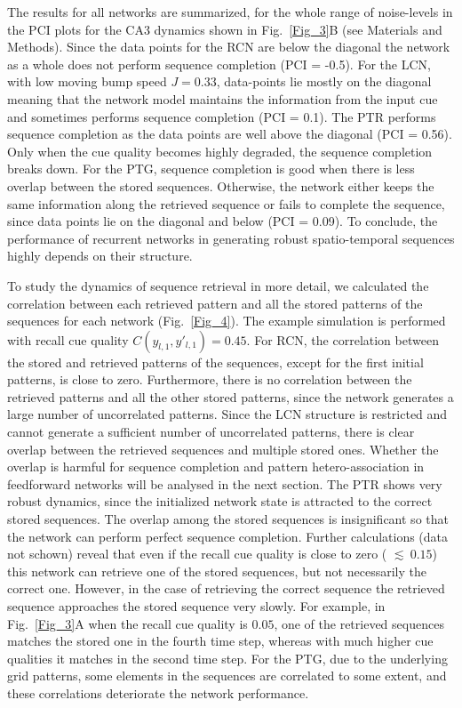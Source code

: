 \documentclass[utf8]{frontiersSCNS} %
\begin{document}
The results for all networks are summarized, for the whole range of noise-levels in the PCI plots for the CA3 dynamics shown in Fig.~\ref{Fig_3}B (see Materials and Methods). Since the data points for the RCN are below the diagonal the network as a whole does not perform sequence completion (PCI = -0.5). For the LCN, with low moving bump speed $J = 0.33$, data-points lie mostly on the diagonal meaning that the network model maintains the information from the input cue and sometimes performs sequence completion (PCI = 0.1). The PTR performs sequence completion as the data points are well above the diagonal (PCI = 0.56). Only when the cue quality becomes highly degraded, the sequence completion breaks down. For the PTG, sequence completion is good when there is less overlap between the stored sequences. Otherwise, the network either keeps the same information along the retrieved sequence or fails to complete the sequence, since data points lie on the diagonal and below (PCI = 0.09). To conclude, the performance of recurrent networks in generating robust spatio-temporal sequences highly depends on their structure.  

To study the dynamics of sequence retrieval in more detail, we calculated the correlation between each retrieved pattern and all the stored patterns of the sequences for each network (Fig.~\ref{Fig_4}). The example simulation is performed with recall cue quality $C(y_{l,1}, y'_{l,1}) = 0.45$. For RCN, the correlation between the stored and retrieved patterns of the sequences, except for the first initial patterns, is close to zero. Furthermore, there is no correlation between the retrieved patterns and all the other stored patterns, since the network generates a large number of uncorrelated patterns. Since the LCN structure is restricted and cannot generate a sufficient number of uncorrelated patterns, there is clear overlap between the retrieved sequences and multiple stored ones. Whether the overlap is harmful for sequence completion and pattern hetero-association in feedforward networks will be analysed in the next section. The PTR shows very robust dynamics, since the initialized network state is attracted to the correct stored sequences. The overlap among the stored sequences is insignificant so that the network can perform perfect sequence completion. 
%
Further calculations (data not schown) reveal that even if the recall cue quality is close to zero ( $\lesssim \: 0.15$) this network can retrieve one of the stored sequences, but not necessarily the correct one. However, in the case of retrieving the correct sequence the retrieved sequence approaches the stored sequence very slowly. For example, in Fig.~\ref{Fig_3}A when the recall cue quality is $0.05$, one of the retrieved sequences matches the stored one in the fourth time step, whereas with much higher cue qualities it matches in the second time step.    
%
For the PTG, due to the underlying grid patterns, some elements in the sequences are correlated to some extent, and these correlations deteriorate the network performance.
\end{document}
